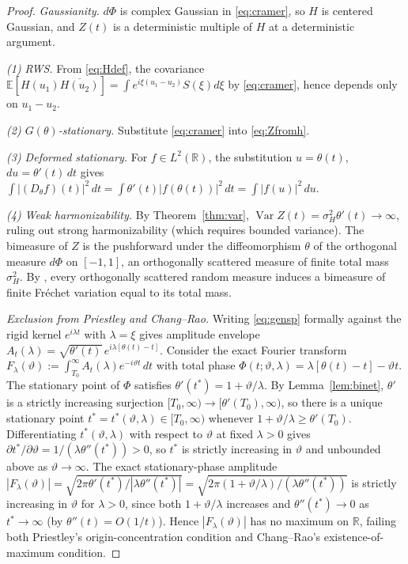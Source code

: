 \documentclass[11pt]{amsart}
\theoremstyle{definition}
\DeclareMathOperator{\Var}{Var}
\begin{document}
\begin{proof}
\emph{Gaussianity.} $d\Phi$ is complex Gaussian in \eqref{eq:cramer}, so
$H$ is centered Gaussian, and $Z(t)$ is a deterministic multiple of $H$
at a deterministic argument.

\emph{(1) RWS.} From \eqref{eq:Hdef}, the covariance
$\mathbb{E}[H(u_{1})\overline{H(u_{2})}]=\int e^{i\xi(u_{1}-u_{2})}S(\xi)d\xi$
by \eqref{eq:cramer}, hence depends only on $u_{1}-u_{2}$.

\emph{(2) $G(\theta)$-stationary.} Substitute \eqref{eq:cramer} into
\eqref{eq:Zfromh}.

\emph{(3) Deformed stationary.} For $f\in L^{2}(\mathbb{R})$, the
substitution $u=\theta(t)$, $du=\theta'(t)\,dt$ gives
$\int|(D_{\theta}f)(t)|^{2}\,dt = \int\theta'(t)|f(\theta(t))|^{2}\,dt = \int|f(u)|^{2}\,du$.

\emph{(4) Weak harmonizability.} By Theorem~\ref{thm:var},
$\Var Z(t)=\sigma_{H}^{2}\theta'(t)\to\infty$, ruling out strong
harmonizability (which requires bounded variance). The bimeasure of $Z$
is the pushforward under the diffeomorphism $\theta$ of the orthogonal
measure $d\Phi$ on $[-1,1]$, an orthogonally scattered measure of finite
total mass $\sigma_{H}^{2}$. By \cite[Thm.~1]{Rao1984}, every
orthogonally scattered random measure induces a bimeasure of finite
Fr\'echet variation equal to its total mass.

\emph{Exclusion from Priestley and Chang--Rao.} Writing \eqref{eq:gensp}
formally against the rigid kernel $e^{i\lambda t}$ with $\lambda=\xi$
gives amplitude envelope
$A_{t}(\lambda) = \sqrt{\theta'(t)}\,e^{i\lambda[\theta(t)-t]}$.
Consider the exact Fourier transform
$F_{\lambda}(\vartheta):=\int_{T_{0}}^{\infty}A_{t}(\lambda)e^{-i\vartheta t}\,dt$
with total phase $\Phi(t;\vartheta,\lambda)=\lambda[\theta(t)-t]-\vartheta t$.
The stationary point of $\Phi$ satisfies
$\theta'(t^{*})=1+\vartheta/\lambda$. By Lemma~\ref{lem:binet}, $\theta'$
is a strictly increasing surjection $[T_{0},\infty)\to[\theta'(T_{0}),\infty)$,
so there is a unique stationary point $t^{*}=t^{*}(\vartheta,\lambda)\in[T_{0},\infty)$
whenever $1+\vartheta/\lambda\ge\theta'(T_{0})$. Differentiating
$t^{*}(\vartheta,\lambda)$ with respect to $\vartheta$ at fixed
$\lambda>0$ gives $\partial t^{*}/\partial\vartheta = 1/(\lambda\theta''(t^{*}))>0$,
so $t^{*}$ is strictly increasing in $\vartheta$ and unbounded above as
$\vartheta\to\infty$. The exact stationary-phase amplitude
$|F_{\lambda}(\vartheta)| = \sqrt{2\pi\theta'(t^{*})/|\lambda\theta''(t^{*})|}
= \sqrt{2\pi(1+\vartheta/\lambda)/(\lambda\theta''(t^{*}))}$
is strictly increasing in $\vartheta$ for $\lambda>0$, since both
$1+\vartheta/\lambda$ increases and $\theta''(t^{*})\to 0$ as
$t^{*}\to\infty$ (by $\theta''(t)=O(1/t)$). Hence $|F_{\lambda}(\vartheta)|$
has no maximum on $\mathbb{R}$, failing both Priestley's origin-concentration
condition and Chang--Rao's existence-of-maximum condition.
\end{proof}
\end{document}
